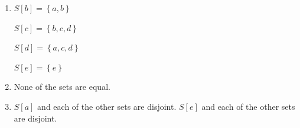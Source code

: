 \documentclass[11pt]{article}
\begin{document}
\begin{enumerate}
\item \begin{multicols}{4}

$S\left[ b \right] = \left\{ {a, b} \right\}$

$S\left[ c \right] = \left\{ {b, c, d} \right\}$

$S\left[ d \right] = \left\{ {a, c, d} \right\}$

$S\left[ e \right] = \left\{ e \right\}$
\end{multicols}

\item None of the sets are equal.

\item $S\left[ a \right]$ and each of the other sets are disjoint. $S\left[ e \right]$ and each of the other sets are disjoint.

\end{enumerate}
\hbreak

\noindent
\end{document}
